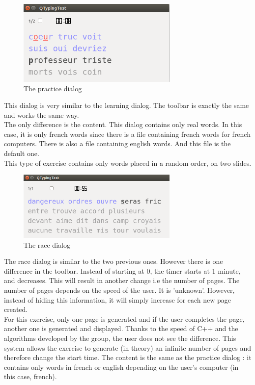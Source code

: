 \begin{figure}[H]
	\centering
	\includegraphics[width=0.7\textwidth]{images/dialog-practice.png}
	 \caption{The practice dialog}
	 \label{dialog-practice}
\end{figure}

This dialog is very similar to the learning dialog. The toolbar is exactly the same and works the same way.\\
The only difference is the content. This dialog contains only real words. In this case, it is only french words since there is a file containing french words for french computers. There is also a file containing english words. And this file is the default one.\\
This type of exercise contains only words placed in a random order, on two slides.

\begin{figure}[H]
	\centering
	\includegraphics[width=0.7\textwidth]{images/dialog-race.png}
	 \caption{The race dialog}
	 \label{dialog-race}
\end{figure}

The race dialog is similar to the two previous ones. However there is one difference in the toolbar. Instead of starting at 0, the timer starts at 1 minute, and decreases. This will result in another change i.e the number of pages. The number of pages depends on the speed of the user. It is 'unknown'. However, instead of hiding this information, it will simply increase for each new page created.\\
For this exercise, only one page is generated and if the user completes the page, another one is generated and displayed. Thanks to the speed of C++ and the algorithms developed by the group, the user does not see the difference. This system allows the exercise to generate (in theory) an infinite number of pages and therefore change the start time.
The content is the same as the practice dialog : it contains only words in french or english depending on the user's computer (in this case, french).\\

